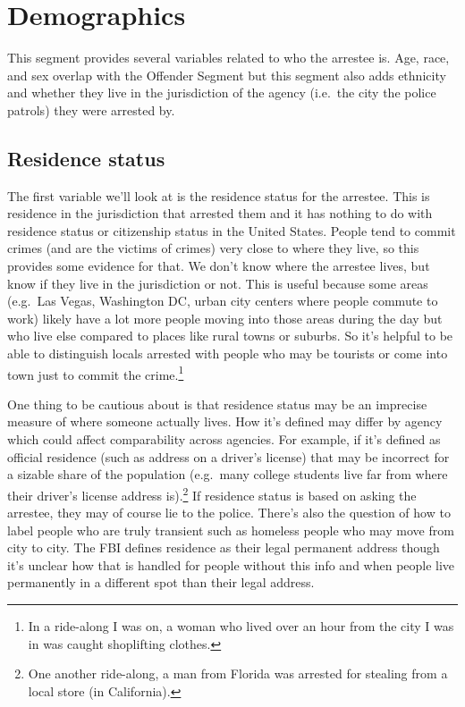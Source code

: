\documentclass[
  12pt,
  openany]{book}
\begin{document}
\section{Demographics}\label{demographics-3}

This segment provides several variables related to who the arrestee is. Age, race, and sex overlap with the Offender Segment but this segment also adds ethnicity and whether they live in the jurisdiction of the agency (i.e.~the city the police patrols) they were arrested by.

\subsection{Residence status}\label{residence-status-1}

The first variable we'll look at is the residence status for the arrestee. This is residence in the jurisdiction that arrested them and it has nothing to do with residence status or citizenship status in the United States. People tend to commit crimes (and are the victims of crimes) very close to where they live, so this provides some evidence for that. We don't know where the arrestee lives, but know if they live in the jurisdiction or not. This is useful because some areas (e.g.~Las Vegas, Washington DC, urban city centers where people commute to work) likely have a lot more people moving into those areas during the day but who live else compared to places like rural towns or suburbs. So it's helpful to be able to distinguish locals arrested with people who may be tourists or come into town just to commit the crime.\footnote{In a ride-along I was on, a woman who lived over an hour from the city I was in was caught shoplifting clothes.}

One thing to be cautious about is that residence status may be an imprecise measure of where someone actually lives. How it's defined may differ by agency which could affect comparability across agencies. For example, if it's defined as official residence (such as address on a driver's license) that may be incorrect for a sizable share of the population (e.g.~many college students live far from where their driver's license address is).\footnote{One another ride-along, a man from Florida was arrested for stealing from a local store (in California).} If residence status is based on asking the arrestee, they may of course lie to the police. There's also the question of how to label people who are truly transient such as homeless people who may move from city to city. The FBI defines residence as their legal permanent address though it's unclear how that is handled for people without this info and when people live permanently in a different spot than their legal address.
\end{document}
